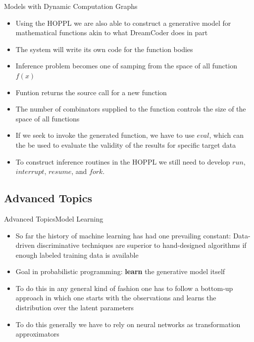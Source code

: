 \documentclass[AERbeamer%
              ,optEnglish%
              ,optBiber%
              ,optBibstyleAlphabetic%
              ,optBeamerClassicFormat%
              ]{AERlatex}%
\begin{document}
\begin{frame}[c]{Models with Dynamic Computation Graphs}
    \centering
    \begin{itemize}
        \item Using the HOPPL we are also able to construct a generative model for mathematical functions
              akin to what DreamCoder does in part
        \item The system will write its own code for the function bodies
        \item Inference problem becomes one of samping from the space of all function $f(x)$
        \item Funtion returns the source call for a new function
        \item The number of combinators supplied to the function controls the size of the space of all functions
        \item If we seek to invoke the generated function, we have to use $eval$, which can the be used to
              evaluate the validity of the results for specific target data
        \item To construct inference routines in the HOPPL we still need to develop $run$, $interrupt$,
              $resume$, and $fork$.
    \end{itemize}
\end{frame}



\subsection{Advanced Topics}

\begin{frame}[c]{Advanced Topics}{Model Learning}
    \centering
    \begin{itemize}
        \item So far the history of machine learning has had one prevailing constant: Data-driven discriminative techniques
              are superior to hand-designed algorithms if enough labeled training data is available
        \item Goal in probabilistic programming: \textbf{learn} the generative model itself
        \item To do this in any general kind of fashion one has to follow a bottom-up approach in which one
              starts with the observations and learns the distribution over the latent parameters
        \item To do this generally we have to rely on neural networks as transformation approximators
    \end{itemize}
\end{frame}
\end{document}
